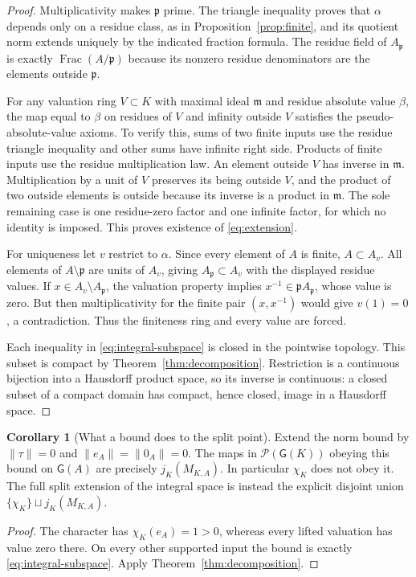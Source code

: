 \documentclass[11pt,a4paper]{article}
\theoremstyle{definition}\newtheorem{definition}[theorem]{Definition}
\newcommand{\G}{\mathsf G}\newcommand{\Tor}{\operatorname{Tor}}\newcommand{\Frac}{\operatorname{Frac}}
\newtheorem{corollary}[theorem]{Corollary}
\begin{document}
\begin{proof}
Multiplicativity makes $\mathfrak p$ prime. The triangle inequality proves
that $\alpha$ depends only on a residue class, as in
Proposition~\ref{prop:finite}, and its quotient norm extends uniquely by
the indicated fraction formula. The residue field of $A_{\mathfrak p}$
is exactly $\Frac(A/\mathfrak p)$ because its nonzero residue denominators
are the elements outside $\mathfrak p$.

For any valuation ring $V\subset K$ with maximal ideal $\mathfrak m$
and residue absolute value $\beta$, the map equal to $\beta$ on residues
of $V$ and infinity outside $V$ satisfies the pseudo-absolute-value
axioms. To verify this, sums of two finite inputs use the residue triangle
inequality and other sums have infinite right side. Products of finite
inputs use the residue multiplication law. An element outside $V$ has
inverse in $\mathfrak m$. Multiplication by a unit of $V$ preserves its
being outside $V$, and the product of two outside elements is outside
because its inverse is a product in $\mathfrak m$. The sole remaining
case is one residue-zero factor and one infinite factor, for which no
identity is imposed. This proves existence of \eqref{eq:extension}.

For uniqueness let $v$ restrict to $\alpha$. Since every element of $A$
is finite, $A\subset A_v$. All elements of $A\setminus\mathfrak p$ are
units of $A_v$, giving $A_{\mathfrak p}\subset A_v$ with the displayed
residue values. If $x\in A_v\setminus A_{\mathfrak p}$, the valuation
property implies $x^{-1}\in\mathfrak p A_{\mathfrak p}$, whose value is
zero. But then multiplicativity for the finite pair $(x,x^{-1})$ would
give $v(1)=0$, a contradiction. Thus the finiteness ring and every value
are forced.

Each inequality in \eqref{eq:integral-subspace} is closed in the pointwise
topology. This subset is compact by Theorem~\ref{thm:decomposition}.
Restriction is a continuous bijection into a Hausdorff product space,
so its inverse is continuous: a closed subset of a compact domain has
compact, hence closed, image in a Hausdorff space.
\end{proof}

\begin{corollary}[What a bound does to the split point]
Extend the norm bound by $\|\tau\|=0$ and
$\|e_A\|=\|0_A\|=0$. The maps in $\mathcal P(\G(K))$ obeying this bound
on $\G(A)$ are precisely $j_K(M_{K,A})$. In particular $\chi_K$ does not
obey it. The full split extension of the integral space is instead the
explicit disjoint union $\{\chi_K\}\sqcup j_K(M_{K,A})$.
\end{corollary}
\begin{proof}
The character has $\chi_K(e_A)=1>0$, whereas every lifted valuation has
value zero there. On every other supported input the bound is exactly
\eqref{eq:integral-subspace}. Apply Theorem~\ref{thm:decomposition}.
\end{proof}
\end{document}
